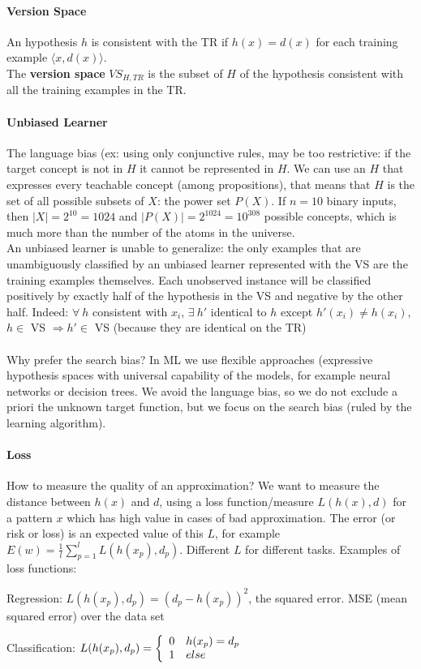 \documentclass[10pt]{report}
\begin{document}
\paragraph{Version Space} An hypothesis $h$ is consistent with the TR if $h(x) = d(x)$ for each training example $\langle x, d(x)\rangle$.\\
The \textbf{version space} $VS_{H, TR}$ is the subset of $H$ of the hypothesis consistent with all the training examples in the TR.
\paragraph{Unbiased Learner} The language bias (ex: using only conjunctive rules, may be too restrictive: if the target concept is not in $H$ it cannot be represented in $H$. We can use an $H$ that expresses every teachable concept (among propositions), that means that $H$ is the set of all possible subsets of $X$: the power set $P(X)$. If $n = 10$ binary inputs, then $|X| = 2^{10} = 1024$ and $|P(X)| = 2^{1024} = 10^{308}$ possible concepts, which is much more than the number of the atoms in the universe.\\
An unbiased learner is unable to generalize: the only examples that are unambiguously classified by an unbiased learner represented with the VS are the training examples themselves. Each unobserved instance will be classified positively by exactly half of the hypothesis in the VS and negative by the other half. Indeed: $\forall\: h$ consistent with $x_i$, $\exists\:h'$ identical to $h$ except $h'(x_i) \neq h(x_i)$, $h\in$ VS $\Rightarrow h'\in$ VS (because they are identical on the TR)\\\\
Why prefer the search bias? In ML we use flexible approaches (expressive hypothesis spaces with universal capability of the models, for example neural networks or decision trees. We avoid the language bias, so we do not exclude a priori the unknown target function, but we focus on the search bias (ruled by the learning algorithm).
\paragraph{Loss} How to measure the quality of an approximation? We want to measure the distance between $h(x)$ and $d$, using a loss function/measure $L(h(x), d)$ for a pattern $x$ which has high value in cases of bad approximation. The error (or risk or loss) is an expected value of this $L$, for example $E(w) = \frac{1}{l}\sum_{p=1}^l L(h(x_p), d_p)$. Different $L$ for different tasks. Examples of loss functions:
\begin{list}{}{}
	\item Regression: $L(h(x_p), d_p) = (d_p - h(x_p))^2$, the squared error. MSE (mean squared error) over the data set
	\item Classification: $L(h(x_p), d_p) = \left\{\begin{array}{l l}
		0 & h(x_p) = d_p\\
		1 & else
	\end{array}\right.$
\end{list}
\end{document}
